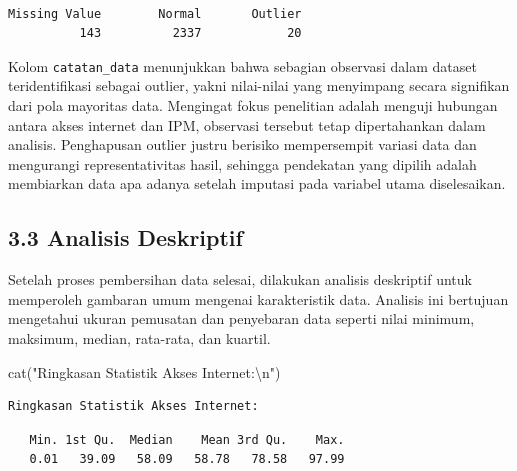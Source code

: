 \documentclass[
  indonesian,
  letterpaper,
  DIV=11,
  numbers=noendperiod]{scrartcl}
\newenvironment{Shaded}{\begin{snugshade}}{\end{snugshade}}
\newcommand{\FunctionTok}[1]{\textcolor[rgb]{0.28,0.35,0.67}{#1}}
\newcommand{\NormalTok}[1]{\textcolor[rgb]{0.00,0.23,0.31}{#1}}
\newcommand{\SpecialCharTok}[1]{\textcolor[rgb]{0.37,0.37,0.37}{#1}}
\newcommand{\StringTok}[1]{\textcolor[rgb]{0.13,0.47,0.30}{#1}}
\begin{document}
\begin{verbatim}

Missing Value        Normal       Outlier 
          143          2337            20 
\end{verbatim}

Kolom \texttt{catatan\_data} menunjukkan bahwa sebagian observasi dalam
dataset teridentifikasi sebagai outlier, yakni nilai-nilai yang
menyimpang secara signifikan dari pola mayoritas data. Mengingat fokus
penelitian adalah menguji hubungan antara akses internet dan IPM,
observasi tersebut tetap dipertahankan dalam analisis. Penghapusan
outlier justru berisiko mempersempit variasi data dan mengurangi
representativitas hasil, sehingga pendekatan yang dipilih adalah
membiarkan data apa adanya setelah imputasi pada variabel utama
diselesaikan.

\subsection{3.3 Analisis Deskriptif}\label{analisis-deskriptif}

Setelah proses pembersihan data selesai, dilakukan analisis deskriptif
untuk memperoleh gambaran umum mengenai karakteristik data. Analisis ini
bertujuan mengetahui ukuran pemusatan dan penyebaran data seperti nilai
minimum, maksimum, median, rata-rata, dan kuartil.

\begin{Shaded}
\begin{Highlighting}[]
\FunctionTok{cat}\NormalTok{(}\StringTok{"Ringkasan Statistik Akses Internet:}\SpecialCharTok{\textbackslash{}n}\StringTok{"}\NormalTok{)}
\end{Highlighting}
\end{Shaded}

\begin{verbatim}
Ringkasan Statistik Akses Internet:
\end{verbatim}

\begin{Shaded}
\end{Shaded}

\begin{verbatim}
   Min. 1st Qu.  Median    Mean 3rd Qu.    Max. 
   0.01   39.09   58.09   58.78   78.58   97.99 
\end{verbatim}
\end{document}

